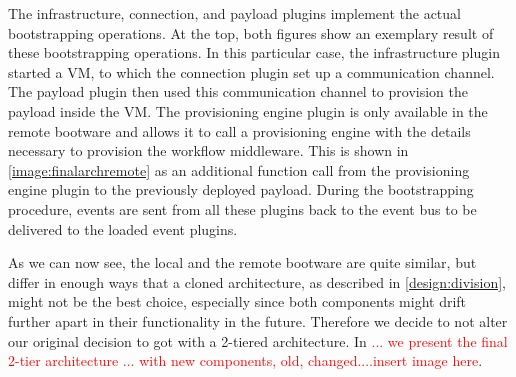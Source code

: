 The infrastructure, connection, and payload plugins implement the actual bootstrapping operations.
At the top, both figures show an exemplary result of these bootstrapping operations.
In this particular case, the infrastructure plugin started a VM, to which the connection plugin set up a communication channel.
The payload plugin then used this communication channel to provision the payload inside the VM.
The provisioning engine plugin is only available in the remote bootware and allows it to call a provisioning engine with the details necessary to provision the workflow middleware.
This is shown in \autoref{image:finalarchremote} as an additional function call from the provisioning engine plugin to the previously deployed payload.
During the bootstrapping procedure, events are sent from all these plugins back to the event bus to be delivered to the loaded event plugins.

As we can now see, the local and the remote bootware are quite similar, but differ in enough ways that a cloned architecture, as described in \autoref{design:division}, might not be the best choice, especially since both components might drift further apart in their functionality in the future.
Therefore we decide to not alter our original decision to got with a 2-tiered architecture.
In \textcolor{red}{... we present the final 2-tier architecture ... with new components, old, changed....insert image here}.
